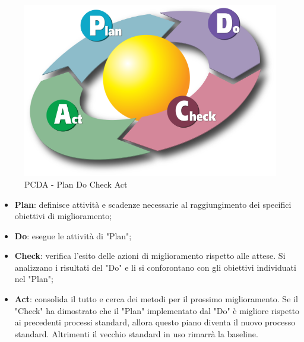     \begin{figure}[h]
        \centering
        \includegraphics[scale=0.2]{sezioni/Immagini/PDCA.png}
        \caption{PCDA - Plan Do Check Act}
    \end{figure}

    \begin{itemize}
        \item \textbf{Plan}: definisce attività e scadenze necessarie al raggiungimento dei specifici obiettivi di miglioramento;
        \item \textbf{Do}: esegue le attività di "Plan";
        \item \textbf{Check}: verifica l'esito delle azioni di miglioramento rispetto alle attese. Si analizzano i risultati del "Do" e li si conforontano con gli obiettivi individuati nel "Plan";
        \item \textbf{Act}: consolida il tutto e cerca dei metodi per il prossimo miglioramento. Se il "Check" ha dimostrato che il "Plan" implementato dal "Do" è migliore rispetto ai precedenti processi standard, allora questo piano diventa il nuovo processo standard. Altrimenti il vecchio standard in uso rimarrà la baseline.
    \end{itemize}